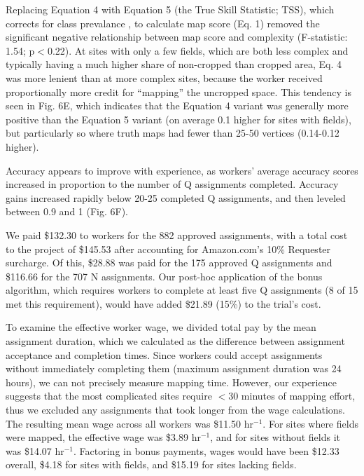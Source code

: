 \documentclass[preprint,12pt,authoryear]{elsarticle}
\begin{document}
Replacing Equation 4 with Equation 5 (the True Skill Statistic; TSS), which corrects for class prevalance  \citep{allouche_assessing_2006}, to calculate map score (Eq. 1) removed the significant negative relationship between map score and complexity (F-statistic: 1.54; p$<$0.22). At sites with only a few fields, which are both less complex and typically having a much higher share of non-cropped than cropped area, Eq. 4 was more lenient than at more complex sites, because the worker received proportionally more credit for ``mapping'' the uncropped space.  This tendency is seen in Fig. 6E, which indicates that the Equation 4 variant was generally more positive than the Equation 5 variant (on average 0.1 higher for sites with fields), but particularly so where truth maps had fewer than 25-50 vertices (0.14-0.12 higher).

Accuracy appears to improve with experience, as workers' average accuracy scores increased in proportion to the number of Q assignments completed. Accuracy gains increased rapidly below 20-25 completed Q assignments, and then leveled between 0.9 and 1 (Fig. 6F).  


We paid \$132.30 to workers for the 882 approved assignments, with a total cost to the project of \$145.53 after accounting for Amazon.com's 10\% Requester surcharge. Of this, \$28.88 was paid for the 175 approved Q assignments and \$116.66 for the 707 N assignments.  Our post-hoc application of the bonus algorithm, which requires workers to complete at least five Q assignments (8 of 15 met this requirement), would have added \$21.89 (15\%) to the trial's cost. 

To examine the effective worker wage, we divided total pay by the mean assignment duration, which we calculated as  the difference between assignment acceptance and completion times. Since workers could accept assignments without immediately completing them (maximum assignment duration was 24 hours), we can not precisely measure mapping time. However, our experience suggests that the most complicated sites require $<$30 minutes of mapping effort, thus we excluded any assignments that took longer from the wage calculations. The resulting mean wage across all workers was \$11.50 hr$^{-1}$. For sites where fields were mapped, the effective wage was \$3.89 hr$^{-1}$, and for sites without fields it was \$14.07 hr$^{-1}$.  Factoring in bonus payments, wages would have been \$12.33 overall, \$4.18 for sites with fields, and \$15.19 for sites lacking fields. 
\end{document}

